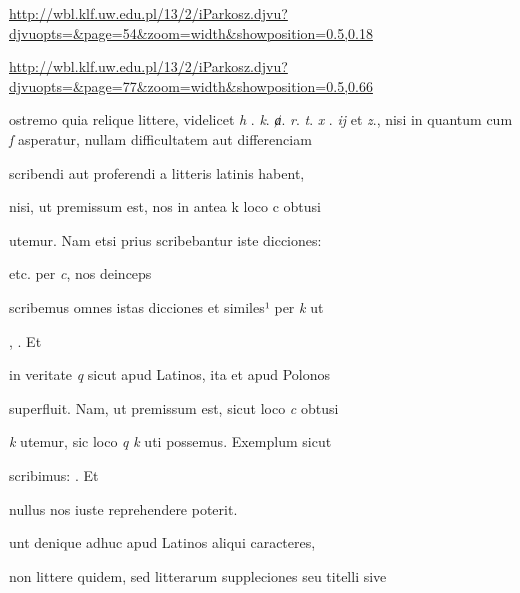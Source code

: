 
\newParkoszpage

{
\url{http://wbl.klf.uw.edu.pl/13/2/iParkosz.djvu?djvuopts=&page=54&zoom=width&showposition=0.5,0.18}

\url{http://wbl.klf.uw.edu.pl/13/2/iParkosz.djvu?djvuopts=&page=77&zoom=width&showposition=0.5,0.66}
}

\bigskip

\obeylines
\mono



\fullpreviouslines


{
\color{blue}

\indentP {}ostremo quia relique littere, videlicet
\textit{h} . \textit{k}. \textit{ⱥ}. \textit{r}. \textit{t}. \textit{x} . \textit{ij} et \textit{z}., nisi in quantum cum
\textit{ſ} asperatur, nullam difficultatem aut  differenciam

scribendi aut proferendi a litteris latinis habent,
}


\fulllines

nisi, ut premissum est, nos in antea k loco c obtusi

utemur. Nam etsi prius scribebantur iste dicciones:  

    etc. per \textit{c}, nos deinceps

scribemus omnes istas dicciones et similes¹ per \textit{k} ut 

 ,    . Et

in veritate \textit{q} sicut apud Latinos, ita et apud Polonos

superfluit. Nam, ut premissum est, sicut loco \textit{c} obtusi

\textit{k} utemur, sic loco \textit{q} \textit{k} uti possemus. Exemplum sicut

scribimus:     . Et

nullus nos iuste reprehendere poterit. 

unt denique adhuc apud Latinos aliqui caracteres,

non littere quidem, sed litterarum suppleciones seu titelli sive 

